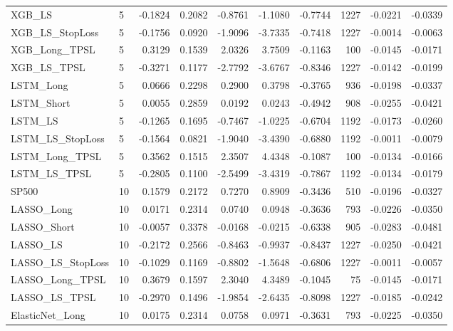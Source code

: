 \begin{tabular}{llrrrrrrrr}
\cline{1-10}
XGB\_LS & 5 & -0.1824 & 0.2082 & -0.8761 & -1.1080 & -0.7744 & 1227 & -0.0221 & -0.0339 \\
\cline{1-10}
XGB\_LS\_StopLoss & 5 & -0.1756 & 0.0920 & -1.9096 & -3.7335 & -0.7418 & 1227 & -0.0014 & -0.0063 \\
\cline{1-10}
XGB\_Long\_TPSL & 5 & 0.3129 & 0.1539 & 2.0326 & 3.7509 & -0.1163 & 100 & -0.0145 & -0.0171 \\
\cline{1-10}
XGB\_LS\_TPSL & 5 & -0.3271 & 0.1177 & -2.7792 & -3.6767 & -0.8346 & 1227 & -0.0142 & -0.0199 \\
\cline{1-10}
LSTM\_Long & 5 & 0.0666 & 0.2298 & 0.2900 & 0.3798 & -0.3765 & 936 & -0.0198 & -0.0337 \\
\cline{1-10}
LSTM\_Short & 5 & 0.0055 & 0.2859 & 0.0192 & 0.0243 & -0.4942 & 908 & -0.0255 & -0.0421 \\
\cline{1-10}
LSTM\_LS & 5 & -0.1265 & 0.1695 & -0.7467 & -1.0225 & -0.6704 & 1192 & -0.0173 & -0.0260 \\
\cline{1-10}
LSTM\_LS\_StopLoss & 5 & -0.1564 & 0.0821 & -1.9040 & -3.4390 & -0.6880 & 1192 & -0.0011 & -0.0079 \\
\cline{1-10}
LSTM\_Long\_TPSL & 5 & 0.3562 & 0.1515 & 2.3507 & 4.4348 & -0.1087 & 100 & -0.0134 & -0.0166 \\
\cline{1-10}
LSTM\_LS\_TPSL & 5 & -0.2805 & 0.1100 & -2.5499 & -3.4319 & -0.7867 & 1192 & -0.0134 & -0.0179 \\
\cline{1-10}
SP500 & 10 & 0.1579 & 0.2172 & 0.7270 & 0.8909 & -0.3436 & 510 & -0.0196 & -0.0327 \\
\cline{1-10}
LASSO\_Long & 10 & 0.0171 & 0.2314 & 0.0740 & 0.0948 & -0.3636 & 793 & -0.0226 & -0.0350 \\
\cline{1-10}
LASSO\_Short & 10 & -0.0057 & 0.3378 & -0.0168 & -0.0215 & -0.6338 & 905 & -0.0283 & -0.0481 \\
\cline{1-10}
LASSO\_LS & 10 & -0.2172 & 0.2566 & -0.8463 & -0.9937 & -0.8437 & 1227 & -0.0250 & -0.0421 \\
\cline{1-10}
LASSO\_LS\_StopLoss & 10 & -0.1029 & 0.1169 & -0.8802 & -1.5648 & -0.6806 & 1227 & -0.0011 & -0.0057 \\
\cline{1-10}
LASSO\_Long\_TPSL & 10 & 0.3679 & 0.1597 & 2.3040 & 4.3489 & -0.1045 & 75 & -0.0145 & -0.0171 \\
\cline{1-10}
LASSO\_LS\_TPSL & 10 & -0.2970 & 0.1496 & -1.9854 & -2.6435 & -0.8098 & 1227 & -0.0185 & -0.0242 \\
\cline{1-10}
ElasticNet\_Long & 10 & 0.0175 & 0.2314 & 0.0758 & 0.0971 & -0.3631 & 793 & -0.0225 & -0.0350 \\

\end{tabular}
